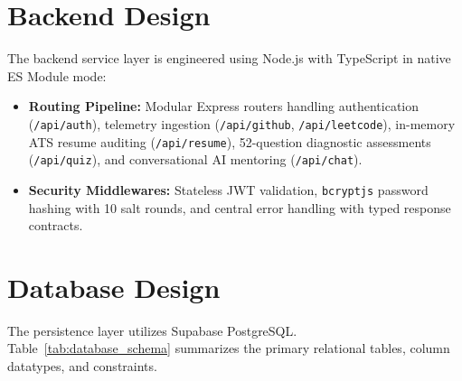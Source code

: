 \documentclass[12pt,a4paper]{report}
\begin{document}
\section{Backend Design}
The backend service layer is engineered using Node.js with TypeScript in native ES Module mode:
\begin{itemize}
    \item \textbf{Routing Pipeline:} Modular Express routers handling authentication (\texttt{/api/auth}), telemetry ingestion (\texttt{/api/github}, \texttt{/api/leetcode}), in-memory ATS resume auditing (\texttt{/api/resume}), 52-question diagnostic assessments (\texttt{/api/quiz}), and conversational AI mentoring (\texttt{/api/chat}).
    \item \textbf{Security Middlewares:} Stateless JWT validation, \texttt{bcryptjs} password hashing with 10 salt rounds, and central error handling with typed response contracts.
\end{itemize}

\section{Database Design}
The persistence layer utilizes Supabase PostgreSQL. Table~\ref{tab:database_schema} summarizes the primary relational tables, column datatypes, and constraints.
\end{document}
